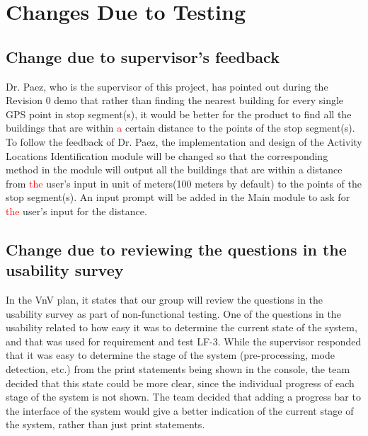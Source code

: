 \documentclass[12pt, titlepage]{article}
\begin{document}
\section{Changes Due to Testing}

\subsection{Change due to supervisor's feedback}
Dr. Paez, who is the supervisor of this project, has pointed out during the Revision 0 demo that rather than finding the nearest building for every single GPS point in stop segment(s), it would be better for the product to find all the buildings that are within \textcolor{red}{a} certain distance to the points of the stop segment(s). To follow the feedback of Dr. Paez, the implementation and design of the Activity Locations Identification module will be changed so that the corresponding method in the module will output all the buildings that are within a distance from \textcolor{red}{the} user's input in unit of meters(100 meters by default) to the points of the stop segment(s). An input prompt will be added in the Main module to ask for \textcolor{red}{the} user's input for the distance.

\subsection{Change due to reviewing the questions in the usability survey}
In the VnV plan, it states that our group will review the questions in the usability survey as part of non-functional testing. One of the questions in the usability related to how easy it was to determine the current state of the system, and that was used for requirement and test LF-3. While the supervisor responded that it was easy to determine the stage of the system (pre-processing, mode detection, etc.) from the print statements being shown in the console, the team decided that this state could be more clear, since the individual progress of each stage of the system is not shown. The team decided that adding a progress bar to the interface of the system would give a better indication of the current stage of the system, rather than just print statements.
\end{document}
